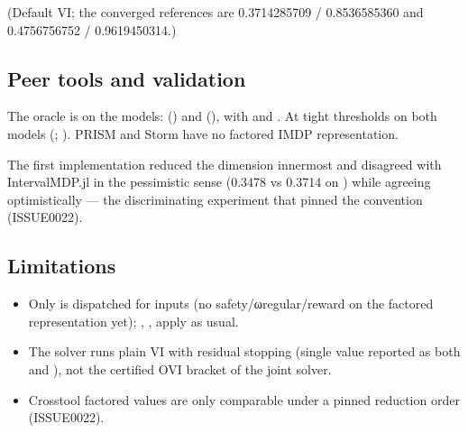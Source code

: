 \documentclass[a4paper,10pt,english]{sphinxmanual}
\begin{document}
\sphinxAtStartPar
(Default  VI; the converged references are 0.3714285709 / 0.8536585360 and
0.4756756752 / 0.9619450314.)


\subsection{Peer tools and validation}
\label{\detokenize{manual/odimdp:peer-tools-and-validation}}
\sphinxAtStartPar
The oracle is  on the  models:
 ()
and  (), with
 and . At tight
thresholds  on both
models (; ). PRISM and Storm have no factored
IMDP representation.

\sphinxAtStartPar
The first implementation reduced the  dimension innermost and disagreed with
IntervalMDP.jl in the pessimistic sense (0.3478 vs 0.3714 on ) while agreeing
optimistically — the discriminating experiment that pinned the convention
(ISSUE\sphinxhyphen{}0022).


\subsection{Limitations}
\label{\detokenize{manual/odimdp:limitations}}\begin{itemize}
\item {} 
\sphinxAtStartPar
Only  is dispatched for  inputs (no safety/ω\sphinxhyphen{}regular/reward on the
factored representation yet); , ,  apply as usual.

\item {} 
\sphinxAtStartPar
The  solver runs plain VI with residual stopping (single value reported as
both  and ), not the certified OVI bracket of the joint solver.

\item {} 
\sphinxAtStartPar
Cross\sphinxhyphen{}tool factored values are only comparable under a pinned reduction order
(ISSUE\sphinxhyphen{}0022).

\end{itemize}
\end{document}
